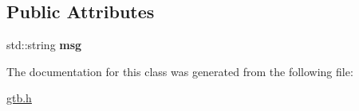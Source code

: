 \subsection*{Public Attributes}
\begin{DoxyCompactItemize}
\item 
\mbox{\label{a00012_a6b8ba43c75374c925d6c439cef67cedf}} 
std\+::string {\bfseries msg}
\end{DoxyCompactItemize}


The documentation for this class was generated from the following file\+:\begin{DoxyCompactItemize}
\item 
\hyperlink{a00005}{gtb.\+h}\end{DoxyCompactItemize}
